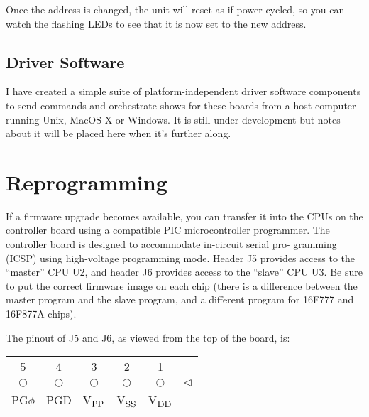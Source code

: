 \documentclass[12pt]{article}
\begin{document}
Once the address is changed, the unit will reset as if power-cycled,
so you can watch the flashing LEDs to see that it is now set to
the new address.

%
%

\subsection{Driver Software}
I have created a simple suite of platform-independent driver software 
components to send commands and orchestrate shows for these boards from
a host computer running Unix, MacOS X or Windows.  It is still under
development but notes about it will be placed here when it's further
along.

\section{Reprogramming}
If a firmware upgrade becomes available, you can transfer it into the CPUs
on the controller board using a compatible PIC microcontroller programmer.
The controller board is designed to accommodate in-circuit serial pro-
gramming (ICSP) using high-voltage programming mode.  Header J5 provides
access to the ``master'' CPU U2, and header J6 provides access to the ``slave''
CPU U3.  Be sure to put the correct firmware image on each chip (there is
a difference between the master program and the slave program, and a different
program for 16F777 and 16F877A chips).

The pinout of J5 and J6, as viewed from the top of the board, is:
\begin{center}
 \begin{tabular}{cccccc}
  5&4&3&2&1\\
  \cline{1-5}
  \multicolumn{1}{|c}{$\bigcirc$}&
  $\bigcirc$&
  $\bigcirc$&
  $\bigcirc$&
  \multicolumn{1}{c|}{$\bigcirc$}&
  \large$\triangleleft$\\
  \cline{1-5}
  PG$\phi$&PGD&V$_{\hbox{\small PP}}$&V$_{\hbox{\small SS}}$&V$_{\hbox{\small
  DD}}$\\
 \end{tabular}
\end{center}
\end{document}
